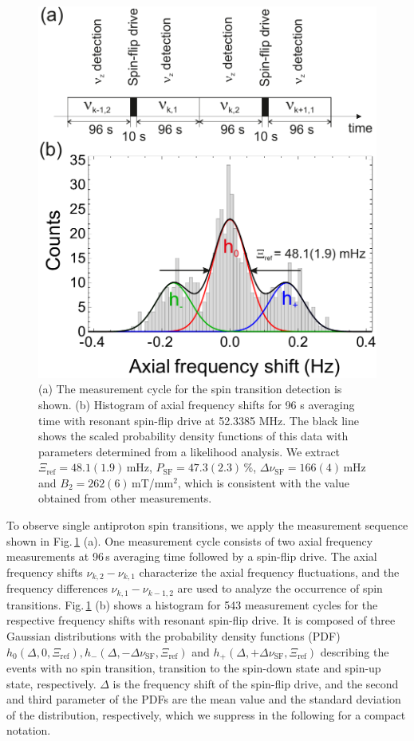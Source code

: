 \documentclass[12pt,preprint%
]{elsarticle}
\begin{document}
\begin{figure}[htb]
        \centerline{\includegraphics[width=0.48 \textwidth,keepaspectratio]{FIG3SSF.pdf}}
            \caption[Filter]{ (a) The measurement cycle for the spin transition detection is shown. (b) Histogram of axial frequency shifts for 96 s averaging time with resonant spin-flip drive at 52.3385 MHz. The black line shows the scaled probability density functions of this data with parameters determined from a likelihood analysis. We extract $\Xi_{\mathrm{ref}}=48.1(1.9)\,$mHz, $P_{\mathrm{SF}}=47.3(2.3)\,\%$, $\Delta\nu_{\mathrm{SF}}=166(4)\,$mHz and $B_2 = 262(6)\,$mT/mm$^2$, which is consistent with the value obtained from other measurements.} 
						\label{fig2}
    \end{figure}

To observe single antiproton spin transitions, we apply the measurement sequence shown in Fig.$\,$\ref{fig2} (a). One measurement cycle consists of two axial frequency measurements at 96$\,$s averaging time followed by a spin-flip drive. The axial frequency shifts $\nu_{k,2}-\nu_{k,1}$ characterize the axial frequency fluctuations, and the frequency differences $\nu_{k,1}-\nu_{k-1,2}$ are used to analyze the occurrence of spin transitions. Fig.$\,$\ref{fig2} (b) shows a histogram for 543 measurement cycles for the respective frequency shifts with resonant spin-flip drive. It is composed of three Gaussian distributions with the probability density functions (PDF) $h_0(\Delta,0,\Xi_{\mathrm{ref}}), h_-(\Delta,-\Delta\nu_{\mathrm{SF}},\Xi_{\mathrm{ref}})$ and $h_+(\Delta,+\Delta\nu_{\mathrm{SF}},\Xi_{\mathrm{ref}})$ describing the events with no spin transition, transition to the spin-down state and spin-up state, respectively. $\Delta$ is the frequency shift of the spin-flip drive, and the second and third parameter of the PDFs are the mean value and the standard deviation of the distribution, respectively, which we suppress in the following for a compact notation. 
\end{document}

